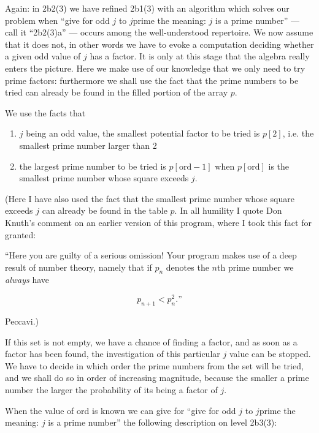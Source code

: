 Again: in 2b2(3) we have refined 2b1(3) with an algorithm which solves our problem when ``give for odd $j$ to $j$prime the meaning: $j$ is a prime number'' --- call it ``2b2(3)a'' --- occurs among the well-understood repertoire. We now assume that it does not, in other words we have to evoke a computation deciding whether a given odd value of $j$ has a factor. It is only at this stage that the algebra really enters the picture. Here we make use of our knowledge that we only need to try prime factors: furthermore we shall use the fact that the prime numbers to be tried can already be found in the filled portion of the array $p$.

We use the facts that

\begin{enumerate}[label=(\arabic*)]
	\item $j$ being an odd value, the smallest potential factor to be tried is $p[2]$, i.e. the smallest prime number larger than 2

	\item the largest prime number to be tried is $p[\text{ord} - 1]$ when $p[\text{ord}]$ is the smallest prime number whose square exceeds $j$.
\end{enumerate}

(Here I have also used the fact that the smallest prime number whose square exceeds $j$ can already be found in the table $p$. In all humility I quote Don Knuth's comment on an earlier version of this program, where I took this fact for granted:

\begin{addmargin}[1.5em]{0em}
``Here you are guilty of a serious omission! Your program makes use of a deep result of number theory, namely that if $p_n$ denotes the $n$th prime number we \textit{always} have
\end{addmargin}
$$
p_{n+1}<p_n^2.\text{''}
$$

\noindent
Peccavi.)

If this set is not empty, we have a chance of finding a factor, and as soon as a factor has been found, the investigation of this particular $j$ value can be stopped. We have to decide in which order the prime numbers from the set will be tried, and we shall do so in order of increasing magnitude, because the smaller a prime number the larger the probability of its being a factor of $j$.

When the value of ord is known we can give for ``give for odd $j$ to $j$prime the meaning: $j$ is a prime number'' the following description on level 2b3(3):


